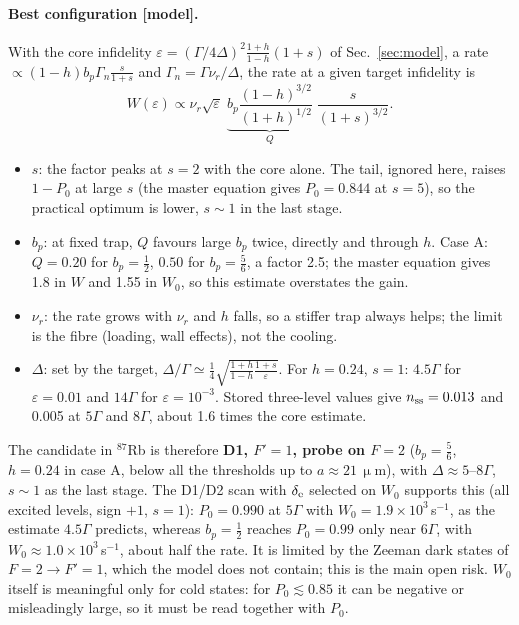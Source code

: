 \documentclass[11pt,a4paper]{article}
\newcommand{\nur}{\nu_r}
\newcommand{\micro}{\upmu}
\begin{document}
\paragraph{Best configuration [model].} With the core infidelity $\varepsilon=(\Gamma/4\Delta)^2\frac{1+h}{1-h}(1+s)$ of Sec.~\ref{sec:model}, a rate $\propto(1-h)b_p\Gamma_n\frac{s}{1+s}$ and $\Gamma_n=\Gamma\nur/\Delta$, the rate at a given target infidelity is
\begin{equation}
  W(\varepsilon)\propto\nur\sqrt\varepsilon\;\underbrace{b_p\frac{(1-h)^{3/2}}{(1+h)^{1/2}}}_{Q}\;\frac{s}{(1+s)^{3/2}} .
\end{equation}
\begin{itemize}
\item $s$: the factor peaks at $s=2$ with the core alone. The tail, ignored here, raises $1-P_0$ at large $s$ (the master equation gives $P_0=0.844$ at $s=5$), so the practical optimum is lower, $s\sim1$ in the last stage.
\item $b_p$: at fixed trap, $Q$ favours large $b_p$ twice, directly and through $h$. Case A: $Q=0.20$ for $b_p=\tfrac12$, $0.50$ for $b_p=\tfrac56$, a factor 2.5; the master equation gives 1.8 in $W$ and 1.55 in $W_0$, so this estimate overstates the gain.
\item $\nur$: the rate grows with $\nur$ and $h$ falls, so a stiffer trap always helps; the limit is the fibre (loading, wall effects), not the cooling.
\item $\Delta$: set by the target, $\Delta/\Gamma\simeq\frac14\sqrt{\frac{1+h}{1-h}\frac{1+s}{\varepsilon}}$. For $h=0.24$, $s=1$: $4.5\Gamma$ for $\varepsilon=0.01$ and $14\Gamma$ for $\varepsilon=10^{-3}$. Stored three-level values give $n_{\rm ss}=0.013$ and 0.005 at $5\Gamma$ and $8\Gamma$, about 1.6 times the core estimate.
\end{itemize}
The candidate in $^{87}$Rb is therefore \textbf{D1, $F'=1$, probe on $F=2$} ($b_p=\tfrac56$, $h=0.24$ in case A, below all the thresholds up to $a\approx21\,\micro$m), with $\Delta\approx5$--$8\Gamma$, $s\sim1$ as the last stage. The D1/D2 scan with $\delta_{\rm e}$ selected on $W_0$ supports this (all excited levels, sign $+1$, $s=1$): $P_0=0.990$ at $5\Gamma$ with $W_0=1.9\times10^3$\,s$^{-1}$, as the estimate $4.5\Gamma$ predicts, whereas $b_p=\tfrac12$ reaches $P_0=0.99$ only near $6\Gamma$, with $W_0\approx1.0\times10^3$\,s$^{-1}$, about half the rate. It is limited by the Zeeman dark states of $F=2\to F'=1$, which the model does not contain; this is the main open risk. $W_0$ itself is meaningful only for cold states: for $P_0\lesssim0.85$ it can be negative or misleadingly large, so it must be read together with $P_0$.
\end{document}

